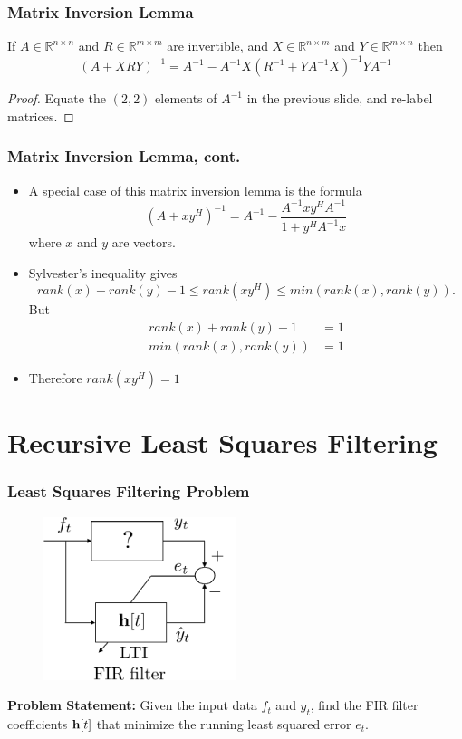 \documentclass{beamer}
\begin{document}
\begin{frame}\frametitle{Matrix Inversion Lemma}
	\begin{lemma}
		If $A\in\mathbb{R}^{n\times n}$ and $R\in\mathbb{R}^{m\times m}$ are invertible, and $X\in\mathbb{R}^{n\times m}$ and $Y\in\mathbb{R}^{m\times n}$ then
		\[ (A + X R Y)^{-1} = A^{-1} - A^{-1}X(R^{-1}+YA^{-1}X)^{-1}YA^{-1} \]
	\end{lemma}
	\begin{proof}  Equate the $(2,2)$ elements of $A^{-1}$ in the previous slide, and re-label matrices.	
	\end{proof}
	
\end{frame}

\begin{frame}\frametitle{Matrix Inversion Lemma, cont.}
	\begin{itemize}
	\item 	A special case of this matrix inversion lemma is the formula
		\[ 
		(A + xy^H)^{-1} = A^{-1} - \frac{A^{-1}xy^H A^{-1}}{1 + y^H A^{-1}x} 
		\]
		where $x$ and $y$ are vectors.
	\item Sylvester's inequality gives
		\[
		rank(x)+rank(y) - 1 \leq rank(xy^H) \leq min(rank(x),rank(y)).
		\]
		But 
		\begin{align*}
			rank(x)+rank(y) - 1	&= 1 \\
			min(rank(x),rank(y)) &= 1
		\end{align*}
	\item Therefore $rank(xy^H) = 1$
	\end{itemize}
\end{frame}


\section{Recursive Least Squares Filtering}
\frame{\sectionpage}

\begin{frame}\frametitle{Least Squares Filtering Problem}
	\begin{figure}
		\includegraphics[width=0.5\textwidth]{figures/chap4_rls}	
	\end{figure}
	
	{\bf Problem Statement:}  Given the input data $f_t$ and $y_t$, find the FIR filter coefficients $\mathbf{h}[t]$ that minimize the running least squared error $e_t$.
	
\end{frame}
\end{document}
